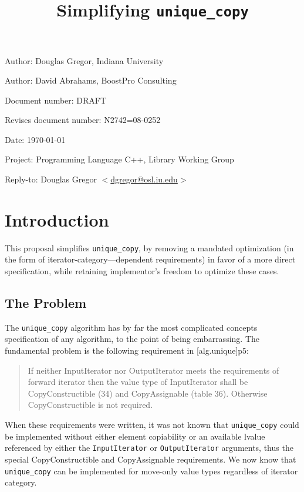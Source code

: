 \documentclass[american]{article}
\newcommand{\code}[1]{\lstinline[basicstyle=\sffamily,keywords={}]{#1}}
\newcommand{\tcode}[1]{\code{#1}}
\begin{document}
\pagestyle{myheadings}

\title{Simplifying \tcode{unique_copy}}
\author{}

\date{}
\maketitle
\vspace{-0.5in}
\par\noindent Author: Douglas Gregor, Indiana University
\par\noindent Author: David Abrahams, BoostPro Consulting
\par\noindent Document number: DRAFT 
\par\noindent Revises document number: N2742=08-0252
\par\noindent Date: \today
\par\noindent Project: Programming Language C++, Library Working Group
\par\noindent Reply-to: Douglas Gregor $<$\href{mailto:dgregor@osl.iu.edu}{dgregor@osl.iu.edu}$>$

\section{Introduction}
This proposal simplifies \tcode{unique_copy}, by removing a mandated
optimization (in the form of iterator-category---dependent requirements)
in favor of a more direct specification, while retaining implementor's
freedom to optimize these cases.

\subsection{The Problem}
The \tcode{unique_copy} algorithm has by far the most complicated
concepts specification of any algorithm, to the point of being
embarrassing. The fundamental problem is
the following requirement in [alg.unique]p5:

\begin{quote}
  If neither InputIterator nor OutputIterator meets the requirements
  of forward iterator then the value type of InputIterator shall be
  CopyConstructible (34) and CopyAssignable (table 36). Otherwise
  CopyConstructible is not required.
\end{quote}

When these requirements were written, it was not known that \tcode{unique_copy}
could be implemented without either element copiability or an available lvalue
referenced by either the \tcode{InputIterator} or \tcode{OutputIterator}
arguments, thus the special CopyConstructible and CopyAssignable requirements.
We now know that \tcode{unique_copy} can be implemented for move-only value
types regardless of iterator category.
\end{document}
